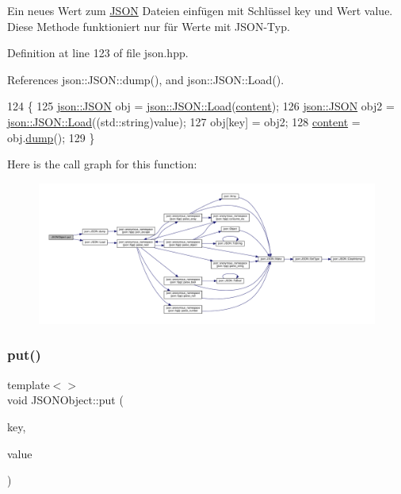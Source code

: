Ein neues Wert zum \mbox{\hyperlink{class_j_s_o_n}{J\+S\+ON}} Dateien einfügen mit Schlüssel {\ttfamily key} und Wert {\ttfamily value}. Diese Methode funktioniert nur für Werte mit J\+S\+O\+N-\/\+Typ. 

Definition at line 123 of file json.\+hpp.



References json\+::\+J\+S\+O\+N\+::dump(), and json\+::\+J\+S\+O\+N\+::\+Load().


\begin{DoxyCode}
124 \{
125     \mbox{\hyperlink{classjson_1_1_j_s_o_n}{json::JSON}} obj = \mbox{\hyperlink{classjson_1_1_j_s_o_n_a799ab1cc68cb6e2a41ec948a9a2ecc37}{json::JSON::Load}}(\mbox{\hyperlink{class_j_s_o_n_ad1ace77234b963a2994178ce7f76a181}{content}});
126     \mbox{\hyperlink{classjson_1_1_j_s_o_n}{json::JSON}} obj2 = \mbox{\hyperlink{classjson_1_1_j_s_o_n_a799ab1cc68cb6e2a41ec948a9a2ecc37}{json::JSON::Load}}((std::string)value);
127     obj[key] = obj2;
128     \mbox{\hyperlink{class_j_s_o_n_ad1ace77234b963a2994178ce7f76a181}{content}} = obj.\mbox{\hyperlink{classjson_1_1_j_s_o_n_acb99af0df2045a504f6bbc08bf5c4990}{dump}}();    
129 \}
\end{DoxyCode}
Here is the call graph for this function\+:
\nopagebreak
\begin{figure}[H]
\begin{center}
\leavevmode
\includegraphics[width=350pt]{class_j_s_o_n_object_a8d8c154a5eec2113eafca987d372ee98_cgraph}
\end{center}
\end{figure}
\mbox{\label{class_j_s_o_n_object_a891e3c2dd856bb8b7bfca0e9994ff846}} 
\subsubsection{\texorpdfstring{put()}{put()}\hspace{0.1cm}{\footnotesize\ttfamily [3/4]}}
{\footnotesize\ttfamily template$<$$>$ \\
void J\+S\+O\+N\+Object\+::put (\begin{DoxyParamCaption}\item[{std\+::string}]{key,  }\item[{\mbox{\hyperlink{class_j_s_o_n_object}{J\+S\+O\+N\+Object}}}]{value }\end{DoxyParamCaption})\hspace{0.3cm}{\ttfamily [inline]}}

